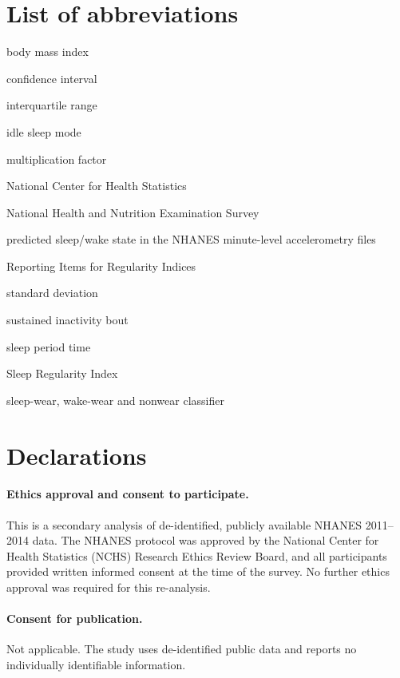 \documentclass[12pt]{article}
\begin{document}
\section*{List of abbreviations}
\begin{description}\setlength{\itemsep}{0pt}
\item[BMI] body mass index
\item[CI] confidence interval
\item[IQR] interquartile range
\item[ISM] idle sleep mode
\item[MF] multiplication factor
\item[NCHS] National Center for Health Statistics
\item[NHANES] National Health and Nutrition Examination Survey
\item[PAXPREDM] predicted sleep/wake state in the NHANES minute-level accelerometry files
\item[RIRI] Reporting Items for Regularity Indices
\item[SD] standard deviation
\item[SIB] sustained inactivity bout
\item[SPT] sleep period time
\item[SRI] Sleep Regularity Index
\item[SWaN] sleep-wear, wake-wear and nonwear classifier
\end{description}

\section*{Declarations}

\paragraph{Ethics approval and consent to participate.} This is a secondary analysis of
de-identified, publicly available NHANES 2011--2014 data. The NHANES protocol was
approved by the National Center for Health Statistics (NCHS) Research Ethics Review
Board, and all participants provided written informed consent at the time of the
survey. No further ethics approval was required for this re-analysis.

\paragraph{Consent for publication.} Not applicable. The study uses de-identified
public data and reports no individually identifiable information.
\end{document}
